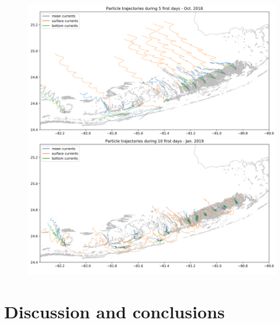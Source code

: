 \documentclass[utf8]{frontiersSCNS}
\begin{document}
\begin{figure}
    \centering
    \includegraphics[width=.9\textwidth]{figures/traj.png}
    \caption{}
    \label{fig:traj}
\end{figure}


\section{Discussion and conclusions}

\end{document}
